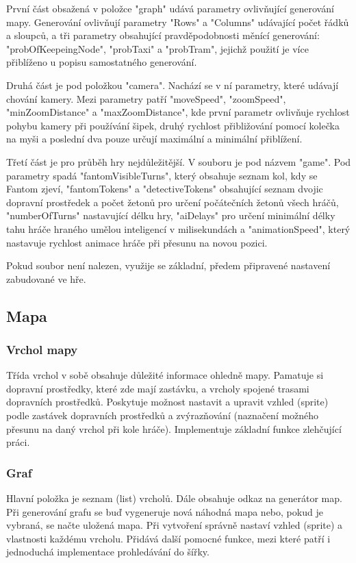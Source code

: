 První část obsažená v položce "graph" udává parametry ovlivňující generování mapy. Generování ovlivňují parametry "Rows" a "Columns" udávající počet řádků a sloupců, a tři parametry obsahující pravděpodobnosti měnící generování: "probOfKeepeingNode", "probTaxi" a "probTram", jejichž použití je více přiblíženo u popisu samostatného generování.

Druhá část je pod položkou "camera". Nachází se v ní parametry, které udávají chování kamery. Mezi parametry patří "moveSpeed", "zoomSpeed", "minZoomDistance" a "maxZoomDistance", kde první parametr ovlivňuje rychlost pohybu kamery při používání šipek, druhý rychlost přibližování pomocí kolečka na myši a poslední dva pouze určují maximální a minimální přiblížení.  

Třetí část je pro průběh hry nejdůležitější. V souboru je pod názvem "game". Pod parametry spadá "fantomVisibleTurns", který obsahuje seznam kol, kdy se Fantom zjeví, "fantomTokens" a "detectiveTokens" obsahující seznam dvojic dopravní prostředek a počet žetonů pro určení počátečních žetonů všech hráčů, "numberOfTurns" nastavující délku hry, "aiDelays" pro určení minimální délky tahu hráče hraného umělou inteligencí v milisekundách a "animationSpeed", který nastavuje rychlost animace hráče při přesunu na novou pozici. 

Pokud soubor není nalezen, využije se základní, předem připravené nastavení zabudované ve hře.


\subsection{Mapa}
\subsubsection{Vrchol mapy}
Třída vrchol v sobě obsahuje důležité informace ohledně mapy. Pamatuje si dopravní prostředky, které zde mají zastávku, a vrcholy spojené trasami dopravních prostředků. Poskytuje možnost nastavit a upravit vzhled (sprite) podle zastávek dopravních prostředků a zvýrazňování (naznačení možného přesunu na daný vrchol při kole hráče). Implementuje základní funkce zlehčující práci. 

\subsubsection{Graf}
Hlavní položka je seznam (list) vrcholů. Dále obsahuje odkaz na generátor map. Při generování grafu se buď vygeneruje nová náhodná mapa nebo, pokud je vybraná, se načte uložená mapa. Při vytvoření správně nastaví vzhled (sprite) a vlastnosti každému vrcholu. Přidává další pomocné funkce, mezi které patří i jednoduchá implementace prohledávání do šířky. 


